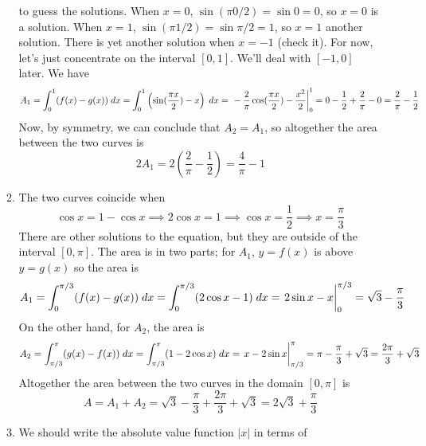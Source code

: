 \documentclass{article}
\begin{document}
\begin{enumerate}
\begin{enumerate}
    to guess the solutions.  When $x=0$, $\sin(\pi 0/2) = \sin 0 = 0$,
    so $x=0$ is a solution.  When $x=1$, $\sin(\pi 1/2) = \sin \pi/2 =
    1$, so $x=1$ another solution.  There is yet another solution when
    $x=-1$ (check it).  For now, let's just concentrate on the
    interval $[0,1]$.  We'll deal with $[-1,0]$ later.  We have
    \begin{equation*}
      A_1 = \int_0^1 (f(x)-g(x)) \; dx
      = \int_0^1 \left( \sin(\frac{\pi x}{2}) - x \right) \; dx
      = \left. \vphantom{\int} -\frac{2}{\pi} \cos(\frac{\pi x}{2}) -
        \frac{x^2}{2} \right|_0^1
      = 0 - \frac{1}{2} + \frac{2}{\pi} - 0
      = \frac{2}{\pi}-\frac{1}{2}
    \end{equation*}
    Now, by symmetry, we can conclude that $A_2=A_1$, so altogether
    the area between the two curves is
    \begin{equation*}
      2A_1 = 2\left(\frac{2}{\pi}-\frac{1}{2}\right) = \frac{4}{\pi} - 1
    \end{equation*}
  \item The two curves coincide when
    \begin{equation*}
      \cos x = 1 - \cos x \implies 2\cos x = 1 \implies \cos x =
      \frac{1}{2}
      \implies x = \frac{\pi}{3}
    \end{equation*}
    There are other solutions to the equation, but they are outside of
    the interval $[0,\pi]$.  The area is in two parts; for $A_1$,
    $y=f(x)$ is above $y=g(x)$ so the area is
    \begin{equation*}
      A_1 = \int_0^{\pi/3} (f(x)-g(x)) \; dx
      = \int_0^{\pi/3} (2\cos x - 1) \; dx
      = \left. \vphantom{\int} 2\sin x -x \right|_0^{\pi/3}
      = \sqrt{3} - \frac{\pi}{3}
    \end{equation*}
    On the other hand, for $A_2$, the area is
    \begin{equation*}
      A_2 = \int_{\pi/3}^\pi (g(x)-f(x)) \; dx
      = \int_{\pi/3}^\pi (1-2\cos x) \; dx
      = \left. \vphantom{\int} x - 2\sin x \right|_{\pi/3}^\pi
      = \pi - \frac{\pi}{3} + \sqrt{3}
      = \frac{2\pi}{3} + \sqrt{3}
    \end{equation*}
    Altogether the area between the two curves in the domain $[0,\pi]$
    is
    \begin{equation*}
      A = A_1 + A_2 = \sqrt{3} - \frac{\pi}{3} + \frac{2\pi}{3} +
      \sqrt{3}
      = 2\sqrt{3} + \frac{\pi}{3}
    \end{equation*}
  \item We should write the absolute value function $|x|$ in terms of

\end{enumerate}
\end{enumerate}
\end{document}
